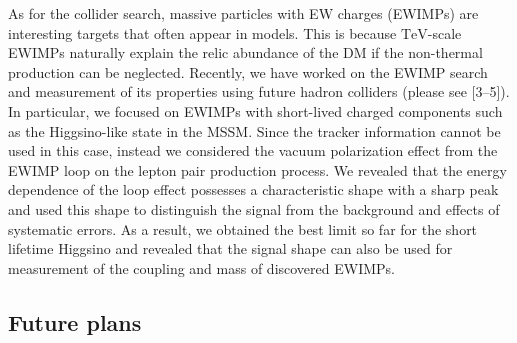 \documentclass[12pt,notitlepage]{article}
\def\rem#1{ {\bf\textcolor{red}{($\clubsuit$ #1 $\clubsuit$)}}}
\begin{document}
As for the collider search, massive particles with EW charges (EWIMPs) are interesting targets that often appear in models.
This is because $\mathrm{TeV}$-scale EWIMPs naturally explain the relic abundance of the DM if the non-thermal production can be neglected.
Recently, we have worked on the EWIMP search and measurement of its properties using future hadron colliders (please see [3--5]).
In particular, we focused on EWIMPs with short-lived charged components such as the Higgsino-like state in the MSSM.
Since the tracker information cannot be used in this case, instead we considered the vacuum polarization effect from the EWIMP loop on the lepton pair production process.
We revealed that the energy dependence of the loop effect possesses a characteristic shape with a sharp peak and used this shape to distinguish the signal from the background and effects of systematic errors.
As a result, we obtained the best limit so far for the short lifetime Higgsino and revealed that the signal shape can also be used for measurement of the coupling and mass of discovered EWIMPs.





\vspace*{-2mm}
\subsection*{Future plans}
\end{document}
